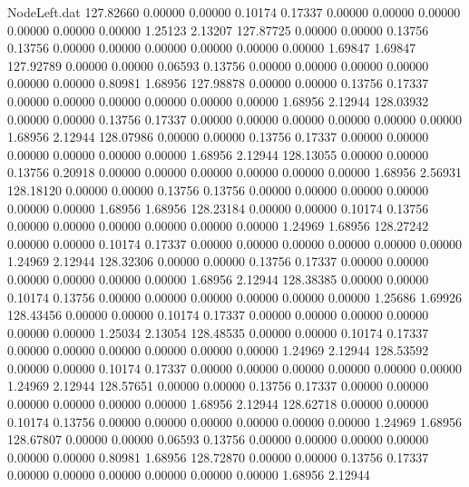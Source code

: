 \begin{filecontents}{NodeLeft.dat}
 127.82660    0.00000    0.00000     0.10174    0.17337    0.00000    0.00000    0.00000    0.00000    0.00000    0.00000    1.25123    2.13207
 127.87725    0.00000    0.00000     0.13756    0.13756    0.00000    0.00000    0.00000    0.00000    0.00000    0.00000    1.69847    1.69847
 127.92789    0.00000    0.00000     0.06593    0.13756    0.00000    0.00000    0.00000    0.00000    0.00000    0.00000    0.80981    1.68956
 127.98878    0.00000    0.00000     0.13756    0.17337    0.00000    0.00000    0.00000    0.00000    0.00000    0.00000    1.68956    2.12944
 128.03932    0.00000    0.00000     0.13756    0.17337    0.00000    0.00000    0.00000    0.00000    0.00000    0.00000    1.68956    2.12944
 128.07986    0.00000    0.00000     0.13756    0.17337    0.00000    0.00000    0.00000    0.00000    0.00000    0.00000    1.68956    2.12944
 128.13055    0.00000    0.00000     0.13756    0.20918    0.00000    0.00000    0.00000    0.00000    0.00000    0.00000    1.68956    2.56931
 128.18120    0.00000    0.00000     0.13756    0.13756    0.00000    0.00000    0.00000    0.00000    0.00000    0.00000    1.68956    1.68956
 128.23184    0.00000    0.00000     0.10174    0.13756    0.00000    0.00000    0.00000    0.00000    0.00000    0.00000    1.24969    1.68956
 128.27242    0.00000    0.00000     0.10174    0.17337    0.00000    0.00000    0.00000    0.00000    0.00000    0.00000    1.24969    2.12944
 128.32306    0.00000    0.00000     0.13756    0.17337    0.00000    0.00000    0.00000    0.00000    0.00000    0.00000    1.68956    2.12944
 128.38385    0.00000    0.00000     0.10174    0.13756    0.00000    0.00000    0.00000    0.00000    0.00000    0.00000    1.25686    1.69926
 128.43456    0.00000    0.00000     0.10174    0.17337    0.00000    0.00000    0.00000    0.00000    0.00000    0.00000    1.25034    2.13054
 128.48535    0.00000    0.00000     0.10174    0.17337    0.00000    0.00000    0.00000    0.00000    0.00000    0.00000    1.24969    2.12944
 128.53592    0.00000    0.00000     0.10174    0.17337    0.00000    0.00000    0.00000    0.00000    0.00000    0.00000    1.24969    2.12944
 128.57651    0.00000    0.00000     0.13756    0.17337    0.00000    0.00000    0.00000    0.00000    0.00000    0.00000    1.68956    2.12944
 128.62718    0.00000    0.00000     0.10174    0.13756    0.00000    0.00000    0.00000    0.00000    0.00000    0.00000    1.24969    1.68956
 128.67807    0.00000    0.00000     0.06593    0.13756    0.00000    0.00000    0.00000    0.00000    0.00000    0.00000    0.80981    1.68956
 128.72870    0.00000    0.00000     0.13756    0.17337    0.00000    0.00000    0.00000    0.00000    0.00000    0.00000    1.68956    2.12944

\end{filecontents}
